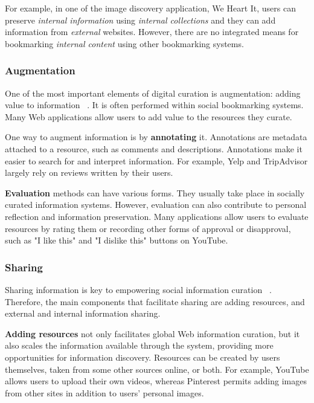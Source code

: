 {{{For example, in one of the image discovery application, We Heart It, users can preserve \textit{internal  information} using \textit{internal collections} and they can add information from \textit{external} websites. However, there are no integrated means for bookmarking \textit{internal content} using other bookmarking systems.  
} %

{\subsubsection{Augmentation}
One of the most important elements of digital curation is augmentation: adding value to information ~\cite{beagrie2008digital,whittaker2011personal}. It is often performed within social bookmarking systems. Many Web applications allow users to add value to the resources they curate. 

One way to augment information is by \textbf{annotating} it. Annotations are metadata attached to a resource, such as comments and descriptions. Annotations make it easier to search for and interpret information. For example, Yelp and TripAdvisor largely rely on reviews written by their users. 

\textbf{Evaluation} methods can have various forms. They usually take place in socially curated information systems. However, evaluation can also contribute to personal reflection and information preservation. Many applications allow users to evaluate resources by rating them or recording other forms of approval or disapproval, such as "I like this" and "I dislike this" buttons on YouTube.
} %

{\subsubsection{Sharing}
Sharing information is key to empowering social information curation ~\cite{beagrie2008digital}. Therefore, the main components that facilitate sharing are adding resources, and external and internal information sharing.

\textbf{Adding resources} not only facilitates global Web information curation, but it also scales the information available through the system, providing more opportunities for information discovery. Resources can be created by users themselves, taken from some other sources online, or both. For example, YouTube allows users to upload their own videos, whereas Pinterest permits adding images from other sites in addition to users' personal images. 

}}}
